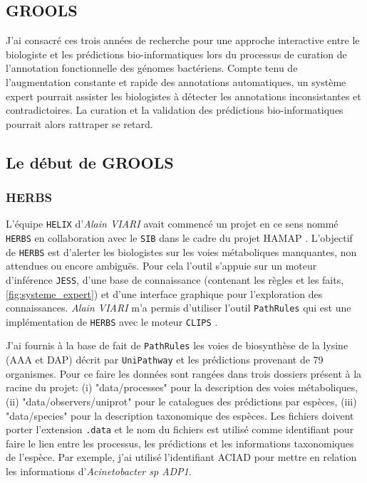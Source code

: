\begin{refsegment}
\chapter{GROOLS}

J'ai consacré ces trois années de recherche pour une approche interactive entre le biologiste et les prédictions bio-informatiques lors du processus de curation de l'annotation fonctionnelle des génomes bactériens. Compte tenu de l'augmentation constante et rapide des annotations automatiques, un système expert pourrait assister les biologistes à détecter les annotations inconsistantes et contradictoires. La curation et la validation des prédictions bio-informatiques pourrait alors rattraper se retard.

\section{Le début de GROOLS}

\subsection{HERBS}

L'équipe \texttt{HELIX} d'\textit{Alain VIARI} avait commencé un projet en ce sens nommé \texttt{\gls{HERBS}} en collaboration avec le \texttt{\gls{SIB}} dans le cadre du projet \gls{HAMAP} \cite{pedruzzi2015hamap}. L'objectif de \texttt{\gls{HERBS}} est d'alerter les biologistes sur les voies métaboliques manquantes, non attendues ou encore ambiguës. Pour cela l'outil s'appuie sur un moteur d'inférence \texttt{\gls{JESS}}, d'une base de connaissance (contenant les règles et les faits, \cref{fig:systeme_expert}) et d'une interface graphique pour l'exploration des connaissances. \textit{Alain VIARI} m'a permis d'utiliser l'outil \texttt{PathRules} qui est une implémentation de \texttt{\gls{HERBS}} avec le moteur \texttt{\gls{CLIPS}} \cite{riley1991clips}.


J'ai fournis à la base de fait de  \texttt{PathRules} les voies de biosynthèse de la lysine (AAA et DAP) décrit par \texttt{UniPathway} et les prédictions provenant de 79 organismes. Pour ce faire les données sont rangées dans trois dossiers présent à la racine du projet: (i) "data/processes" pour la description des voies métaboliques, (ii) "data/observers/uniprot" pour le catalogues des prédictions par espèces, (iii) "data/species" pour la description taxonomique des espèces. Les fichiers doivent porter l'extension \texttt{.data} et le nom du fichiers est utilisé comme identifiant pour faire le lien entre les processus, les prédictions et les informations taxonomiques de l'espèce. Par exemple, j'ai utilisé l'identifiant ACIAD pour mettre en relation les informations d'\textit{Acinetobacter sp ADP1}.


\end{refsegment}
